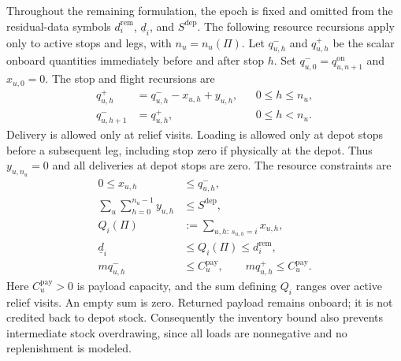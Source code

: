 Throughout the remaining formulation, the epoch is fixed and omitted from
the residual-data symbols $d_i^{\mathrm{rem}}$, $\underline d_i$, and
$S^{\mathrm{dep}}$.
The following resource recursions apply only to active stops and legs,
with $n_u=n_u(\Pi)$. Let $q_{u,h}^{-}$ and
$q_{u,h}^{+}$ be the scalar onboard quantities immediately before and
after stop $h$. Set
$q_{u,0}^{-}=q_{u,n+1}^{\mathrm{on}}$ and $x_{u,0}=0$.
The stop and flight recursions are
\begin{align}
q_{u,h}^{+}&=q_{u,h}^{-}-x_{u,h}+y_{u,h},
&&0\le h\le n_u,
\label{eq:residual_flow}\\
q_{u,h+1}^{-}&=q_{u,h}^{+},
&&0\le h<n_u.
\label{eq:flight_payload}
\end{align}
Delivery is allowed only at relief visits. Loading is allowed only at
depot stops before a subsequent leg, including stop zero if physically at
the depot. Thus $y_{u,n_u}=0$ and all deliveries at depot stops are zero.
The resource constraints are
\begin{align}
0\le x_{u,h}&\le q_{u,h}^{-},
\label{eq:delivery_availability}\\
\sum_{u}\sum_{h=0}^{n_u-1}y_{u,h}&\le S^{\mathrm{dep}},
\label{eq:residual_inventory}\\
Q_i(\Pi)&:=\sum_{u,h:\,s_{u,h}=i}x_{u,h},
\label{eq:planned_delivery}\\
\underline d_i&\le Q_i(\Pi)\le d_i^{\mathrm{rem}},
\label{eq:mandatory_service}\\
m q_{u,h}^{-}&\le C_u^{\mathrm{pay}},
\qquad
m q_{u,h}^{+}\le C_u^{\mathrm{pay}}.
\label{eq:payload_constraint}
\end{align}
Here $C_u^{\mathrm{pay}}>0$ is payload capacity, and the sum defining
$Q_i$ ranges over active relief visits. An empty sum is zero.
Returned payload remains onboard; it is not credited back to depot stock.
Consequently the inventory bound also prevents intermediate stock
overdrawing, since all loads are nonnegative and no replenishment is modeled.

